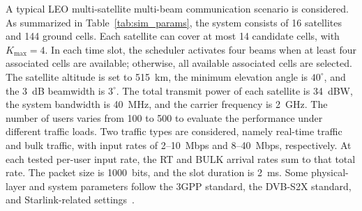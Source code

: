 \documentclass[journal]{IEEEtran}
\begin{document}
A typical LEO multi-satellite multi-beam communication scenario is considered. As summarized in Table~\ref{tab:sim_params}, the system consists of 16 satellites and 144 ground cells. Each satellite can cover at most 14 candidate cells, with $K_{\max}=4$. In each time slot, the scheduler activates four beams when at least four associated cells are available; otherwise, all available associated cells are selected. The satellite altitude is set to 515~km, the minimum elevation angle is $40^\circ$, and the 3~dB beamwidth is $3^\circ$. The total transmit power of each satellite is 34~dBW, the system bandwidth is 40~MHz, and the carrier frequency is 2~GHz. The number of users varies from 100 to 500 to evaluate the performance under different traffic loads. Two traffic types are considered, namely real-time traffic and bulk traffic, with input rates of 2--10~Mbps and 8--40~Mbps, respectively. At each tested per-user input rate, the RT and BULK arrival rates sum to that total rate. The packet size is 1000~bits, and the slot duration is 2~ms. Some physical-layer and system parameters follow the 3GPP standard, the DVB-S2X standard, and Starlink-related settings~\cite{ref29,ref33,ref34}.
\end{document}
